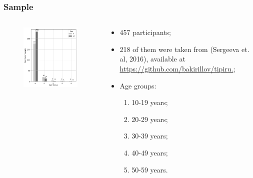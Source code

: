 \documentclass[11pt,xcolor=x11names,compress]{beamer}
\renewcommand{\(}{\begin{columns}}
\renewcommand{\)}{\end{columns}}
\newcommand{\<}[1]{\begin{column}{#1}}
\renewcommand{\>}{\end{column}}
\begin{document}
\begin{frame}
	\frametitle{Sample}
	\begin{columns}
	\begin{column}{0.5\textwidth}
	\begin{figure}
		\includegraphics[width=\textwidth]{genderage.png}
	\end{figure}
	\end{column}
	\begin{column}{0.5\textwidth}
	\small
	\begin{itemize}
		\item 457 participants;
		\item 218 of them were taken from (Sergeeva et. al, 2016), available at \url{https://github.com/bakirillov/tipiru.};
		\item Age groups:
		\begin{enumerate}
			\item 10-19 years;
			\item 20-29 years;
			\item 30-39 years;
			\item 40-49 years;
			\item 50-59 years.
		\end{enumerate}
	\end{itemize}
	\end{column}
	\end{columns}
\end{frame}
\end{document}
